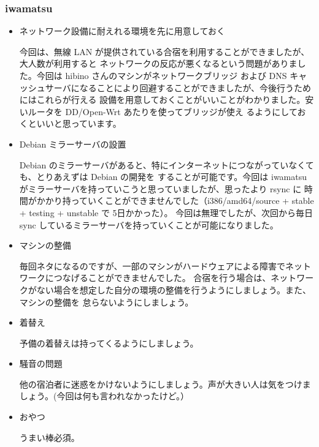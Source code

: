 \documentclass[mingoth,a4paper]{jsarticle}
\begin{document}
\subsubsection{iwamatsu}
\begin{itemize}
\item ネットワーク設備に耐えれる環境を先に用意しておく
 
今回は、無線 LAN が提供されている合宿を利用することができましたが、大人数が利用すると
ネットワークの反応が悪くなるという問題がありました。今回は hibino さんのマシンがネットワークブリッジ
および DNS キャッシュサーバになることにより回避することができましたが、今後行うためにはこれらが行える
設備を用意しておくことがいいことがわかりました。安いルータを DD/Open-Wrt あたりを使ってブリッジが使え
るようにしておくといいと思っています。

\item Debian ミラーサーバの設置

Debian のミラーサーバがあると、特にインターネットにつながっていなくても、とりあえずは Debian の開発を
することが可能です。今回は iwamatsu がミラーサーバを持っていこうと思っていましたが、思ったより rsync に
時間がかかり持っていくことができませんでした（i386/amd64/source + stable + testing + unstable で 5日かかった）。
今回は無理でしたが、次回から毎日 sync しているミラーサーバを持っていくことが可能になりました。

\item マシンの整備

毎回ネタになるのですが、一部のマシンがハードウェアによる障害でネットワークにつなげることができませんでした。
合宿を行う場合は、ネットワークがない場合を想定した自分の環境の整備を行うようにしましょう。また、マシンの整備を
怠らないようにしましょう。

\item 着替え

予備の着替えは持ってくるようにしましょう。

\item 騒音の問題

他の宿泊者に迷惑をかけないようにしましょう。声が大きい人は気をつけましょう。(今回は何も言われなかったけど。）

\item おやつ

うまい棒必須。

\end{itemize}
\end{document}
